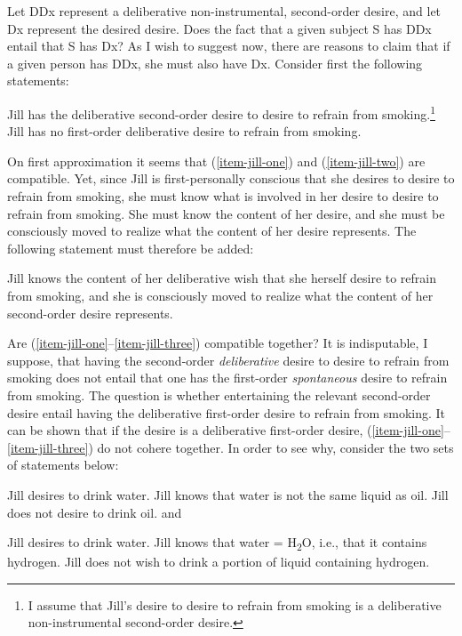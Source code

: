 \documentclass[output=paper,colorlinks,citecolor=brown
]{langscibook}
\begin{document}
Let DDx represent a deliberative non-instrumental, second-order desire, and let Dx represent the desired desire. Does the fact that a given subject S has DDx entail that S has Dx? As I wish to suggest now, there are reasons to claim that if a given person has DDx, she must also have Dx.
Consider first the following statements:

\ea \label{item-jill-one}Jill has the deliberative second-order desire to desire to refrain from smoking.\footnote{I assume that Jill's desire to desire to refrain from smoking is a deliberative non-instrumental second-order desire.}
\ex\label{item-jill-two}Jill has no first-order deliberative desire to refrain from smoking. 
\z

On first approximation it seems that (\ref{item-jill-one}) and (\ref{item-jill-two}) are compatible. Yet, since Jill is first-personally conscious that she desires to desire to refrain from smoking, she must know what is involved in her desire to desire to refrain from smoking. She must know the content of her desire, and she must be consciously moved to realize what the content of her desire represents. The following statement must therefore be added: 

\ea\label{item-jill-three}	Jill knows the content of her deliberative wish that she herself desire to refrain from smoking, and she is consciously moved to realize what the content of her second-order desire represents. 
\z

Are (\ref{item-jill-one}--\ref{item-jill-three}) compatible together? It is indisputable, I suppose, that having the second-order \textit{deliberative} desire to desire to refrain from smoking does not entail that one has the first-order \textit{spontaneous} desire to refrain from smoking. The question is whether entertaining the relevant second-order desire entail having the deliberative first-order desire to refrain from smoking. It can be shown that if the desire is a deliberative first-order desire, (\ref{item-jill-one}--\ref{item-jill-three}) do not cohere together. In order to see why, consider the two sets of statements below:

\ea\label{item-jill-four}	Jill desires to drink water.
\ex\label{item-jill5}	Jill knows that water is not the same liquid as oil. 
\ex\label{item-jill-six}	Jill does not desire to drink oil.
\z
\noindent
and

\ea\label{item-jill-seven}	Jill desires to drink water.
\ex\label{item-jill8}	Jill knows that water = H\textsubscript{2}O, i.e., that it contains hydrogen.
\ex\label{item-jill-nine}	Jill does not wish to drink a portion of liquid containing hydrogen.
\z
\end{document}
